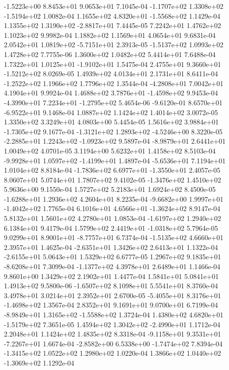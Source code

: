 -1.5223e+00  8.8453e+01  9.0653e+01  7.1045e-04
-1.1707e+02  1.3308e+02 -1.5194e+02  1.0082e-04
 1.1655e+02  4.8320e+01 -1.5568e+02  1.1429e-04
 1.1355e+02  1.3190e+02 -2.8817e+01  7.4445e-05
7.2242e+01 1.4762e+02 1.1023e+02  9.9982e-04
1.1882e+02 1.1569e+01 4.0654e+01  9.6831e-04
 2.0542e+01  1.0819e+02 -5.7151e+01  2.3913e-05
-1.5137e+02  1.0993e+02  1.4728e+02  7.7755e-06
1.3600e+02 1.0482e+02 5.4414e+01  7.6488e-04
 1.7322e+01  1.0125e+01 -1.9102e+01  1.5475e-04
 2.4755e+01  9.3660e+01 -1.5212e+02  8.0269e-05
1.4939e+02 4.0134e+01 2.1731e+01  8.6411e-04
-1.2522e+02  1.1966e+02  1.7796e+02  1.3544e-04
-4.2808e+01  7.0042e+01  4.1904e+01  9.9924e-04
 1.4688e+02  3.7876e+01 -1.4598e+02  9.9453e-04
-4.3990e+01  7.2234e+01 -1.2795e+02  5.4654e-06
-9.6120e-01  8.6570e+01 -6.9522e+01  9.1468e-04
1.0887e+02 1.1424e+02 1.4014e+02  3.0072e-05
1.3350e+02 3.3249e+01 4.0803e+00  5.4454e-05
 1.5616e+02  3.9884e+01 -1.7305e+02  9.1677e-04
-1.3121e+02  1.2893e+02 -4.5246e+00  8.3220e-05
-2.2885e+01  1.2243e+02 -1.0923e+02  9.5897e-04
-8.9879e+01  2.6441e+01  1.0049e+02  4.0701e-05
3.1194e+00 5.6232e+01 1.4158e+02  8.5103e-04
-9.9928e+01  1.0597e+02 -1.4199e+01  1.4897e-04
-5.6536e+01  7.1194e+01  1.0104e+02  8.8184e-04
-1.7836e+02  6.6977e+01 -1.3550e+01  2.4057e-05
8.0607e+01 5.0744e+01 1.7807e+02  9.4102e-05
-1.3476e+02  1.4510e+02  5.9636e+00  9.1550e-04
1.5727e+02 5.2183e+01 1.6924e+02  8.4500e-05
-1.6288e+01  1.2936e+02  4.2604e+01  8.2235e-04
-9.6682e+00  1.9997e+01 -1.4042e+02  1.7765e-04
 6.1016e+01  4.6566e+01 -1.3624e+02  8.9147e-04
5.8132e+01 1.5601e+02 4.2780e+01  1.0853e-04
-1.6197e+02  1.2940e+02  6.1384e+01  9.4179e-04
 1.5799e+02  2.4419e+01 -1.0318e+02  5.7964e-05
 9.0299e+01  8.9001e+01 -8.7757e+01  6.7374e-04
-1.5135e+02  4.6660e+01  2.3957e+01  1.4625e-04
-2.6351e+01  1.3426e+02  2.6413e+01  1.1322e-04
-2.6155e+01  5.0643e+01  1.5329e+02  6.6777e-05
 1.2967e+02  9.1835e+01 -8.6208e+01  7.3099e-04
-1.1377e+02  4.3978e+01  2.6489e+01  1.1466e-04
9.8601e+00 1.3429e+02 2.1902e+01  1.4477e-04
1.5841e+01 5.0841e+01 1.4913e+02  9.5800e-06
-1.6507e+02  8.1098e+01  5.5541e+01  8.3760e-04
3.4978e+01 3.0214e+01 2.3952e+01  2.6700e-05
-5.4055e+01  8.3176e+01 -1.4698e+02  1.3567e-04
2.8352e+01 9.1691e+01 9.0700e+01  6.7199e-04
-8.9849e+01  1.3165e+02 -1.5588e+02  1.3724e-04
 1.4380e+02  4.6820e+01 -1.5179e+02  7.3651e-05
 1.4594e+02  1.3042e+02 -2.4990e+01  1.1712e-04
2.2048e+01 1.1424e+02 1.4835e+02  8.3318e-04
-9.1158e+01  9.3531e+01 -7.2267e+01  1.6674e-04
-2.8582e+00  6.5338e+00 -1.7474e+02  7.8394e-04
-1.3415e+02  1.0522e+02  1.2980e+02  1.0220e-04
 1.3866e+02  1.0440e+02 -1.3069e+02  1.1292e-04

